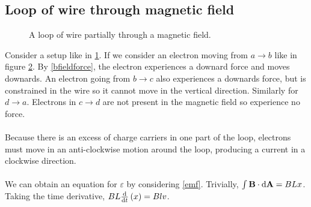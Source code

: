 \documentclass{book}
\begin{document}
\subsection{Loop of wire through magnetic field}
\begin{figure}
	\centering
	\caption{A loop of wire partially through a magnetic field.}
	\label{loopofwire}
\end{figure}
Consider a setup like in \ref{loopofwire}. If we consider an electron moving from $a \to b$ like in figure \ref{electronmotion}.  By \eqref{bfieldforce}, the electron experiences a downard force and moves downards. An electron going from $b \to c$ also experiences a downards force, but is constrained in the wire so it cannot move in the vertical direction. Similarly for $d \to a$. Electrons in $c \to d$ are not present in the magnetic field so experience no force.
\\\\
Because there is an excess of charge carriers in one part of the loop, electrons must move in an anti-clockwise motion around the loop, producing a current in a clockwise direction. 
\\\\
We can obtain an equation for $\varepsilon$ by considering \eqref{emf}. Trivially, $\int\vb{B}\cdot\dd{\vb{A}} = BLx$. Taking the time derivative, $BL\dv{}{t}\left(x\right) = Blv$.
\begin{figure}
	\centering
	\caption{}
	\label{electronmotion}
\end{figure}
\end{document}
